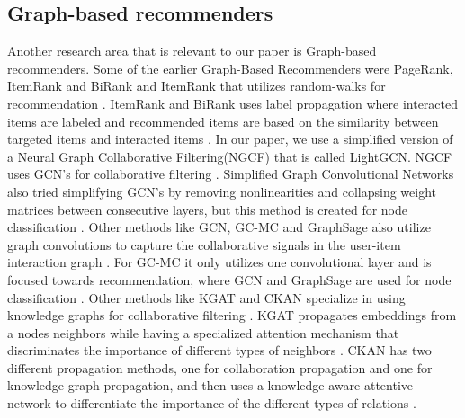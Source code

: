 \subsection{Graph-based recommenders}
Another research area that is relevant to our paper is Graph-based recommenders.
Some of the earlier Graph-Based Recommenders were PageRank, ItemRank and BiRank and ItemRank that utilizes random-walks for recommendation \cite{PageRank,BiRank,ItemRank}.
ItemRank and BiRank uses label propagation where interacted items are labeled and recommended items are based on the similarity between targeted items and interacted items \cite{BiRank,ItemRank}.
In our paper, we use a simplified version of a Neural Graph Collaborative Filtering(NGCF) that is called LightGCN.
NGCF uses GCN's for collaborative filtering \cite{lightgcn,NGCF_2019}.
Simplified Graph Convolutional Networks also tried simplifying GCN's by removing nonlinearities and collapsing weight matrices between consecutive layers, but this method is created for node classification \cite{lightgcn,SGCN}.
Other methods like GCN, GC-MC and GraphSage also utilize graph convolutions to capture the collaborative signals in the user-item interaction graph \cite{GCN,GC_MC,GraphSage}.
For GC-MC it only utilizes one convolutional layer and is focused towards recommendation\cite{GC_MC}, where GCN and GraphSage are used for node classification \cite{GCN,GraphSage}.
Other methods like KGAT and CKAN specialize in using knowledge graphs for collaborative filtering \cite{KGAT,CKAN}.
KGAT propagates embeddings from a nodes neighbors while having a specialized attention mechanism that discriminates the importance of different types of neighbors \cite{KGAT}.
CKAN has two different propagation methods, one for collaboration propagation and one for knowledge graph propagation, and then uses a knowledge aware attentive network to differentiate the importance of the different types of relations \cite{CKAN}.


